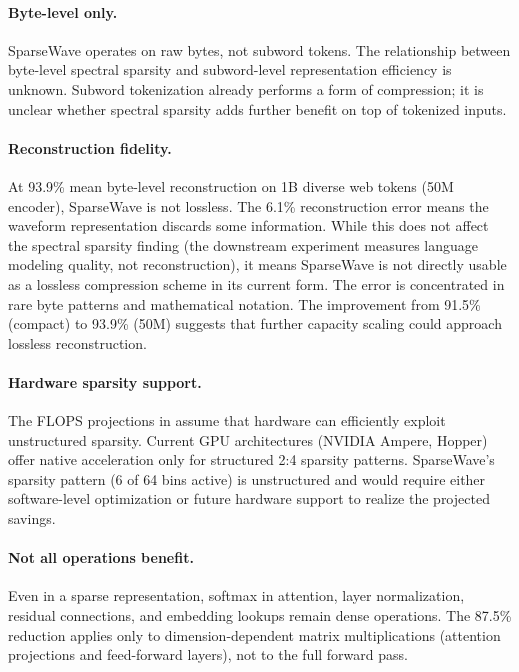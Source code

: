 \documentclass[10pt,twocolumn]{article}
\begin{document}
\paragraph{Byte-level only.} SparseWave operates on raw bytes, not subword tokens. The relationship between byte-level spectral sparsity and subword-level representation efficiency is unknown. Subword tokenization already performs a form of compression; it is unclear whether spectral sparsity adds further benefit on top of tokenized inputs.

\paragraph{Reconstruction fidelity.} At 93.9\% mean byte-level reconstruction on 1B diverse web tokens (50M encoder), SparseWave is not lossless. The 6.1\% reconstruction error means the waveform representation discards some information. While this does not affect the spectral sparsity finding (the downstream experiment measures language modeling quality, not reconstruction), it means SparseWave is not directly usable as a lossless compression scheme in its current form. The error is concentrated in rare byte patterns and mathematical notation. The improvement from 91.5\% (compact) to 93.9\% (50M) suggests that further capacity scaling could approach lossless reconstruction.

\paragraph{Hardware sparsity support.} The FLOPS projections in  assume that hardware can efficiently exploit unstructured sparsity. Current GPU architectures (NVIDIA Ampere, Hopper) offer native acceleration only for structured 2:4 sparsity patterns. SparseWave's sparsity pattern (6 of 64 bins active) is unstructured and would require either software-level optimization or future hardware support to realize the projected savings.

\paragraph{Not all operations benefit.} Even in a sparse representation, softmax in attention, layer normalization, residual connections, and embedding lookups remain dense operations. The 87.5\% reduction applies only to dimension-dependent matrix multiplications (attention projections and feed-forward layers), not to the full forward pass.
\end{document}
